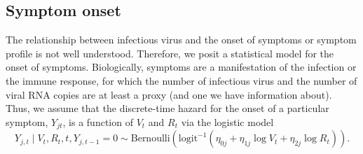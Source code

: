 \documentclass[11pt]{article}
\begin{document}
\subsection{Symptom onset}
The relationship between infectious virus and the onset of symptoms or symptom profile is not well understood. Therefore, we posit a statistical model for the onset of symptoms. Biologically, symptoms are a manifestation of the infection or the immune response, for which the number of infectious virus and the number of viral RNA copies are at least a proxy (and one we have information about). Thus, we assume that the discrete-time hazard for the onset of a particular symptom, $Y_{jt}$, is a function of $V_t$ and $R_t$ via the logistic model
\begin{equation*}
    Y_{j,t} \mid V_t, R_t, t, Y_{j,t-1} = 0 \sim \text{Bernoulli}(\text{logit}^{-1}(\eta_{0j} + \eta_{1j} \log V_t + \eta_{2j} \log R_t)).
\end{equation*}
\end{document}
